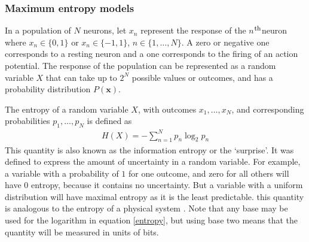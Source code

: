 \documentclass[a4paper,12pt]{article}
\theoremstyle{definition}
\newcommand{\upperth}{$^{\mbox{\footnotesize{th}}}$}%
\begin{document}
\subsubsection{Maximum entropy models}
	In a population of $N$ neurons, let $x_n$ represent the response of the $n$\upperth  neuron where $x_n \in \lbrace 0,1 \rbrace$ or $x_n \in \lbrace -1,1 \rbrace$, $n \in \lbrace 1, \dots, N \rbrace$. A zero or negative one corresponds to a resting neuron and a one corresponds to the firing of an action potential. The response of the population can be represented as a random variable $X$ that can take up to $2^N$ possible values or outcomes, and has a probability distribution $P(\mathbf{x})$. 
	
	The entropy of a random variable $X$, with outcomes $x_1, \dots, x_N$, and corresponding probabilities $p_1, \dots, p_N$ is defined as 
	\begin{align}
	H(X) = -\sum_{n=1}^N p_n \log _2 p_n \label{entropy}
	\end{align}
	This quantity is also known as the information entropy or the `surprise'. It was defined to express the amount of uncertainty in a random variable. For example, a variable with a probability of $1$ for one outcome, and zero for all others will have 0 entropy, because it contains no uncertainty. But a variable with a uniform distribution will have maximal entropy as it is the least predictable. this quantity is analogous to the entropy of a physical system \cite{shannon}. Note that any base may be used for the logarithm in equation \ref{entropy}, but using base two means that the quantity will be measured in units of bits.
	
\end{document}
